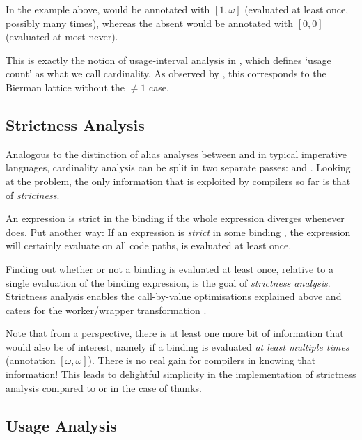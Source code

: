 In the example above,  would be annotated with $[1,\omega]$ (evaluated at least once, possibly many times), whereas the absent  would be annotated with $[0, 0]$ (evaluated at most never).

This is exactly the notion of usage-interval analysis in \textcite[chapter~5]{sestoft}, which defines `usage count' as what we call cardinality.
As observed by \parencite[section~1.5]{warnsbrough}, this corresponds to the Bierman lattice \parencite{bierman} without the $\neq 1$ case.

\subsection{Strictness Analysis}\label{sec:strict}

Analogous to the distinction of alias analyses between \MayAlias and \MustAlias in typical imperative languages, cardinality analysis can be split in two separate passes:
\MinCard and \MaxCard. Looking at the \MinCard problem, the only information that is exploited by compilers so far is that of \emph{strictness}.

An expression  is strict in the binding  if the whole expression diverges whenever  does.
Put another way: 
If an expression is \emph{strict} in some binding , the expression will certainly evaluate  on all code paths, \eg {} is evaluated at least once.

Finding out whether or not a binding is evaluated at least once, relative to a single evaluation of the binding expression, is the goal of \emph{strictness analysis}.
Strictness analysis enables the call-by-value optimisations explained above and caters for the worker/wrapper transformation \parencite{ww}.

Note that from a \MinCard perspective, there is at least one more bit of information that would also be of interest, namely if a binding is evaluated \emph{at least multiple times} (\eg annotation $[\omega,\omega]$).
There is no real gain for compilers in knowing that information!
This leads to delightful simplicity in the implementation of strictness analysis compared to \MinCard or \MaxCard in the case of thunks.


\subsection{Usage Analysis}\label{sec:usage}

